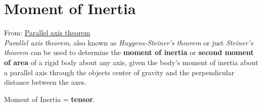 \documentclass[10pt,b5paper,titlepage]{book}
\begin{document}
\section{Moment of Inertia}

From: \href{https://en.wikipedia.org/wiki/Parallel_axis_theorem}{Parallel axis theorem}\\

\textit{Parallel axis theorem}, also known as \textit{Huygens-Steiner's theorem}
or just \textit{Steiner's theorem} can be used to determine the \textbf{moment of inertia}
or \textbf{second moment of area} of a rigid body about any axis, given the body's
moment of inertia about a parallel axis through the objects center of gravity
and the perpendicular distance between the axes.

Moment of Inertia = \textbf{tensor}.
\end{document}
